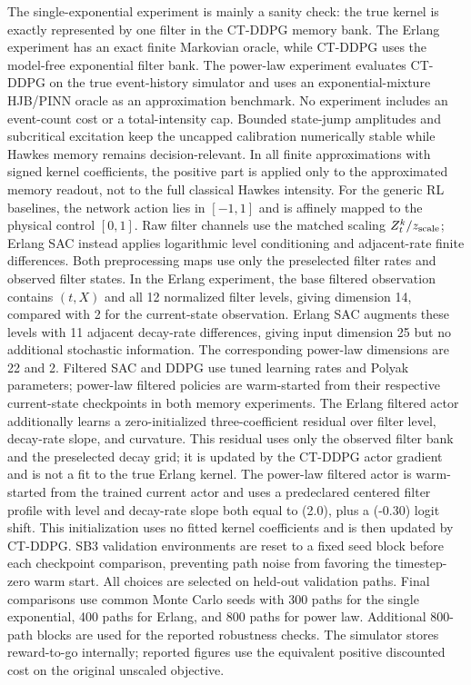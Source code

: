 \documentclass[11pt]{article}
\begin{document}
The single-exponential experiment is mainly a sanity check: the true kernel is
exactly represented by one filter in the CT-DDPG memory bank. The Erlang
experiment has an exact finite Markovian oracle, while CT-DDPG uses the
model-free exponential filter bank. The power-law experiment evaluates CT-DDPG
on the true event-history simulator and uses an exponential-mixture HJB/PINN
oracle as an approximation benchmark. No experiment includes an event-count
cost or a total-intensity cap. Bounded state-jump amplitudes and subcritical
excitation keep the uncapped calibration numerically stable while Hawkes memory
remains decision-relevant. In all finite approximations with signed
kernel coefficients, the positive part is applied only to the approximated
memory readout, not to the full classical Hawkes intensity.
For the generic RL baselines, the network action lies in \([-1,1]\) and is
affinely mapped to the physical control \([0,1]\). Raw filter channels use the
matched scaling \(Z_t^k/z_{\rm scale}\); Erlang SAC instead applies logarithmic
level conditioning and adjacent-rate finite differences. Both preprocessing
maps use only the preselected filter rates and observed filter states. In the Erlang
experiment, the base filtered observation contains \((t,X)\) and all 12
normalized filter levels, giving dimension 14, compared with 2 for the
current-state observation. Erlang SAC augments these levels with 11 adjacent
decay-rate differences, giving input dimension 25 but no additional stochastic
information. The corresponding power-law dimensions are 22 and 2. Filtered
SAC and DDPG use tuned learning rates and Polyak parameters; power-law
filtered policies are warm-started from their respective current-state
checkpoints in both memory experiments. The Erlang filtered actor additionally learns a zero-initialized
three-coefficient residual over filter level, decay-rate slope, and curvature.
This residual uses only the observed filter bank and the preselected decay
grid; it is updated by the CT-DDPG actor gradient and is not a fit to the true
Erlang kernel. The power-law filtered actor is warm-started from the trained
current actor and uses a predeclared centered filter profile with level and
decay-rate slope both equal to (2.0), plus a (-0.30) logit shift. This
initialization uses no fitted kernel coefficients and is then updated by
CT-DDPG. SB3 validation environments are reset to a fixed seed block before
each checkpoint comparison, preventing path noise from favoring the
timestep-zero warm start. All choices are selected on held-out validation paths. Final
comparisons use common Monte Carlo seeds with 300 paths for the single
exponential, 400 paths for Erlang, and 800 paths for power law. Additional
800-path blocks are used for the reported robustness checks. The simulator
stores reward-to-go internally; reported figures use the equivalent positive
discounted cost on the original unscaled objective.
\end{document}
